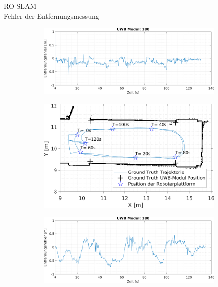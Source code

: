 \documentclass{beamer}
\begin{document}
%
% 
%
\begin{frame}{RO-SLAM\\\normalsize{Fehler der Entfernungsmessung}}
	\begin{figure}
		\centering
		\begin{subfigure}{0.6\linewidth}
			\centering
			\includegraphics[width=\linewidth]{2017-12-18-11-53-54_beacon_range_error1}
		\end{subfigure}
		\hfill
		\begin{subfigure}{0.38\linewidth}
			\centering
			\includegraphics[width=\linewidth]{2017-12-18-11-53-54_beacon_range_error2}
		\end{subfigure}
		\par
		\bigskip
		\begin{subfigure}{0.6\linewidth}
			\centering
			\includegraphics[width=\linewidth]{2018-02-08-12-33-53_beacon_range_error1}

\end{subfigure}
\end{figure}
\end{frame}
\end{document}

